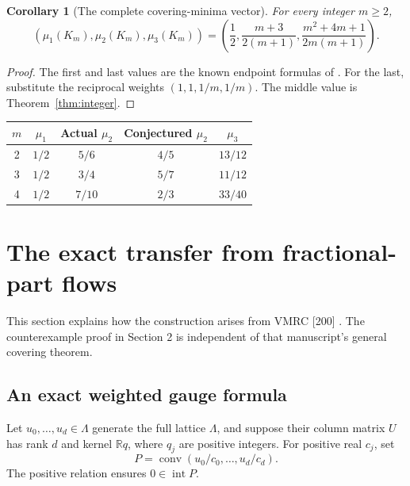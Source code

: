\documentclass[11pt,a4paper]{article}
\newtheorem{corollary}[theorem]{Corollary}
\theoremstyle{remark}
\DeclareMathOperator{\conv}{conv}
\DeclareMathOperator{\inter}{int}
\newcommand{\R}{\mathbb R}\newcommand{\Z}{\mathbb Z}
\begin{document}
\begin{corollary}[The complete covering-minima vector]\label{cor:vector}
For every integer $m\ge2$,
\[
 \left(\mu_1(K_m),\mu_2(K_m),\mu_3(K_m)\right)
 =\left(\frac12,\frac{m+3}{2(m+1)},
        \frac{m^2+4m+1}{2m(m+1)}\right).
\]
\end{corollary}
\begin{proof}
The first and last values are the known endpoint formulas of
\cite[Theorem 1.4 and the paragraph after Conjecture 5.3]{CSS}.
For the last, substitute the reciprocal weights $(1,1,1/m,1/m)$.
The middle value is Theorem~\ref{thm:integer}.
\end{proof}

\begin{center}
\begin{tabular}{@{}ccccc@{}}
\toprule
$m$ & $\mu_1$ & Actual $\mu_2$ & Conjectured $\mu_2$ & $\mu_3$\\
\midrule
2 & $1/2$ & $5/6$ & $4/5$ & $13/12$\\
3 & $1/2$ & $3/4$ & $5/7$ & $11/12$\\
4 & $1/2$ & $7/10$ & $2/3$ & $33/40$\\
\bottomrule
\end{tabular}
\end{center}

\section{The exact transfer from fractional-part flows}
This section explains how the construction arises from VMRC [200]
\cite{VMRC200}. The counterexample proof in Section 2 is independent
of that manuscript's general covering theorem.

\subsection{An exact weighted gauge formula}
Let $u_0,\ldots,u_d\in\Lambda$ generate the full lattice $\Lambda$,
and suppose their column matrix $U$ has rank $d$ and kernel
$\R q$, where $q_j$ are positive integers. For positive real $c_j$, set
\[
 P=\conv(u_0/c_0,\ldots,u_d/c_d).
\]
The positive relation ensures $0\in\inter P$.
\end{document}
